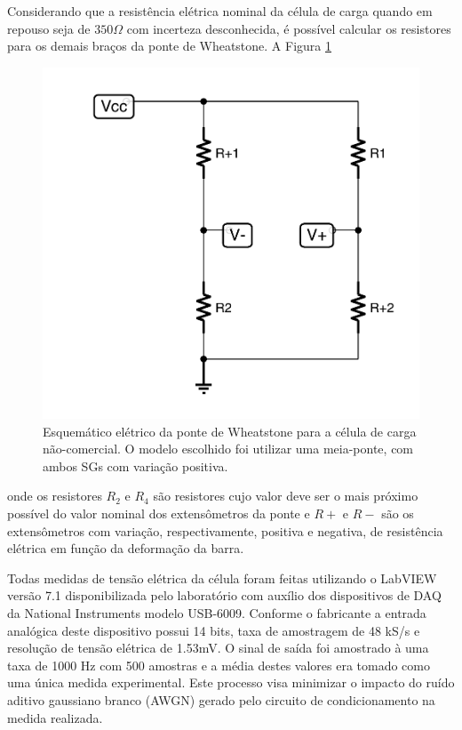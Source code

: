 \documentclass[a4paper]{instrumentacao}
\begin{document}
Considerando que a resistência elétrica nominal da célula de carga quando em repouso seja de $350 \Omega$ com incerteza desconhecida, é possível calcular os resistores para os demais braços da ponte de Wheatstone. A Figura \ref{fig:celula-nao-comercial-ponte}

\begin{figure}[H]
\center
\includegraphics[width=\textwidth]{WheatstoneNaoComercial.pdf}
\caption{Esquemático elétrico da ponte de Wheatstone para a célula de carga não-comercial. O modelo escolhido foi utilizar uma meia-ponte, com ambos SGs com variação positiva.}
\label{fig:celula-nao-comercial-ponte}
\end{figure}

\noindent onde os resistores $R_2$ e $R_4$ são resistores cujo valor deve ser o mais próximo possível do valor nominal dos extensômetros da ponte e $R+$ e $R-$ são os extensômetros com variação, respectivamente, positiva e negativa, de resistência elétrica em função da deformação da barra.

Todas medidas de tensão elétrica da célula foram feitas utilizando o LabVIEW versão 7.1 disponibilizada pelo laboratório com auxílio dos dispositivos de DAQ da National Instruments modelo USB-6009. Conforme o fabricante \cite{daq-specifications} a entrada analógica deste dispositivo possui 14 bits, taxa de amostragem de 48 kS/s e resolução de tensão elétrica de 1.53mV. O sinal de saída foi amostrado à uma taxa de 1000 Hz com 500 amostras e a média destes valores era tomado como uma única medida experimental. Este processo visa minimizar o impacto do ruído aditivo gaussiano branco (AWGN) gerado pelo circuito de condicionamento na medida realizada.
\end{document}
